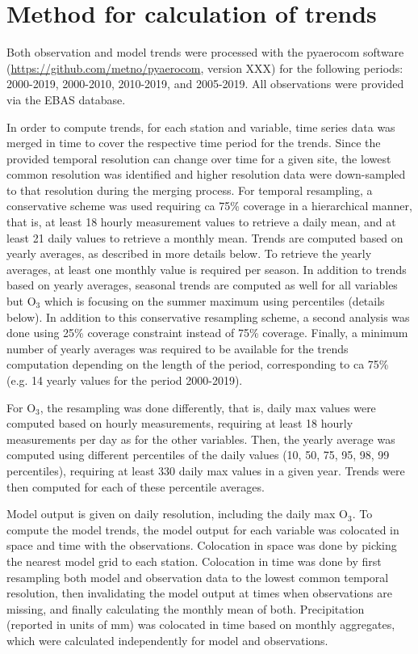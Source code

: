 \section{\label{Method}{Method for calculation of trends}}
Both observation and model trends were processed with the pyaerocom software (\url{https://github.com/metno/pyaerocom}, version XXX) for the following periods: 2000-2019, 2000-2010, 2010-2019, and 2005-2019. All observations were provided via the EBAS database. 

In order to compute trends, for each station and variable, time series data was merged in time to cover the respective time period for the trends.
Since the provided temporal resolution can change over time for a given site, the lowest common resolution was identified and higher resolution data were down-sampled to that resolution during the merging process. For temporal resampling, a conservative scheme was used requiring ca 75\% coverage in a hierarchical manner, that is, at least 18 hourly measurement values to retrieve a daily mean, and at least 21 daily values to retrieve a monthly mean. Trends are computed based on yearly averages, as described in more details below. To retrieve the yearly averages, at least one monthly value is required per season. In addition to trends based on yearly averages, seasonal trends are computed as well for all variables but O$_{3}$ which is focusing on the summer maximum using percentiles (details below). In addition to this conservative resampling scheme, a second analysis was done using 25\% coverage constraint instead of 75\% coverage. Finally, a minimum number of yearly averages was required to be available for the trends computation depending on the length of the period, corresponding to ca 75\% (e.g. 14 yearly values for the period 2000-2019).

For O$_3$, the resampling was done differently, that is, daily max values were computed based on hourly measurements, requiring at least 18 hourly measurements per day as for the other variables. Then, the yearly average was computed using different percentiles of the daily values (10, 50, 75, 95, 98, 99 percentiles), requiring at least 330 daily max values in a given year. Trends were then computed for each of these percentile averages.

Model output is given on daily resolution, including the daily max O$_3$. To compute the model trends, the model output for each variable was colocated in space and time with the observations. Colocation in space was done by picking the nearest model grid to each station. Colocation in time was done by first resampling both model and observation data to the lowest common temporal resolution, then invalidating the model output at times when observations are missing, and finally calculating the monthly mean of both. Precipitation (reported in units of mm) was colocated in time based on monthly aggregates, which were calculated independently for model and observations.

